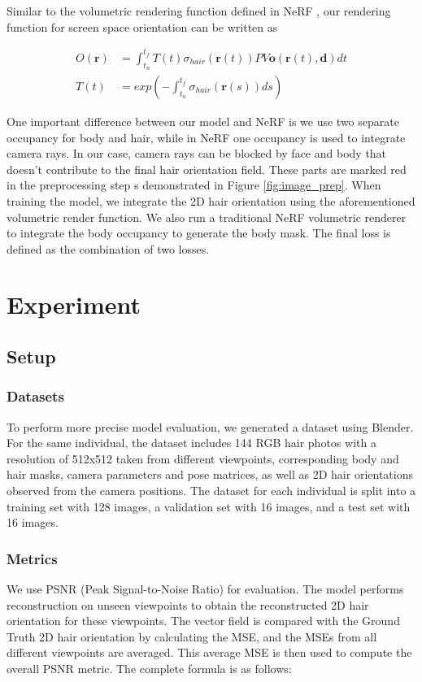 \documentclass[12pt]{article}
\begin{document}
Similar to the volumetric rendering function defined in NeRF \cite{mildenhall_nerf_2020}, our rendering function for screen space orientation can be written as

\begin{align}
	O(\mathbf{r}) & = \int_{t_{n}}^{t_{f}} T(t) \sigma_{hair}(\mathbf{r}(t)) P V \mathbf{o}(\mathbf{r}(t), \mathbf{d}) dt \\
	T(t) & = exp(-\int_{t_{n}}^{t_{f}} \sigma_{hair}(\mathbf{r}(s)) ds)
\end{align}

One important difference between our model and NeRF is we use two separate occupancy for body and hair, while in NeRF one occupancy is used to integrate camera rays. In our case, camera rays can be blocked by face and body that doesn't contribute to the final hair orientation field. These parts are marked red in the preprocessing step s demonstrated in Figure \ref{fig:image_prep}. When training the model, we integrate the 2D hair orientation using the aforementioned volumetric render function. We also run a traditional NeRF volumetric renderer to integrate the body occupancy to generate the body mask. The final loss is defined as the combination of two losses.

\section{Experiment}

\subsection{Setup}

\subsubsection{Datasets} 

To perform more precise model evaluation, we generated a dataset using Blender. For the same individual, the dataset includes 144 RGB hair photos with a resolution of 512x512 taken from different viewpoints, corresponding body and hair masks, camera parameters and pose matrices, as well as 2D hair orientations observed from the camera positions. The dataset for each individual is split into a training set with 128 images, a validation set with 16 images, and a test set with 16 images. 

\subsubsection{Metrics} 
We use PSNR (Peak Signal-to-Noise Ratio) for evaluation. The model performs reconstruction on unseen viewpoints to obtain the reconstructed 2D hair orientation for these viewpoints. The vector field is compared with the Ground Truth 2D hair orientation by calculating the MSE, and the MSEs from all different viewpoints are averaged. This average MSE is then used to compute the overall PSNR metric. The complete formula is as follows:
\end{document}
